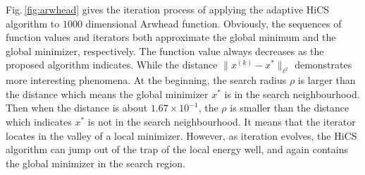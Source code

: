 \documentclass[final,1p,times]{elsarticle}
\begin{document}
Fig.\,\ref{fig:arwhead} gives the iteration process of
applying the adaptive HiCS algorithm to $1000$ dimensional Arwhead function.
Obviously, the sequences of function values and iterators both
approximate the global minimum and the global minimizer, respectively. 
The function value always decreases as the proposed algorithm
indicates. While the distance $\|x^{(k)}-x^*\|_{\ell^2}$
demonstrates more interesting phenomena. At the beginning, the
search radius $\rho$ is larger than the distance which means the global
minimizer $x^*$ is in the search neighbourhood. Then when the distance is
about $1.67\times 10^{-1}$, the $\rho$ is smaller than the
distance which indicates $x^*$ is not in the search neighbourhood. 
It means that the iterator locates in the valley of a local minimizer. 
However, as iteration evolves, the HiCS algorithm can jump out of
the trap of the local energy well, and again contains the global
minimizer in the search region.



%
%
%
\end{document}
